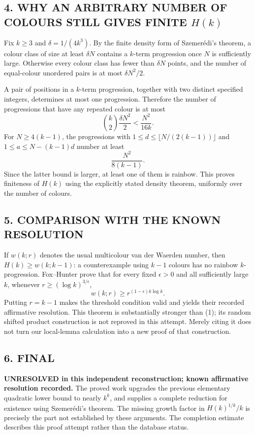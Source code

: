 \subsection*{4. WHY AN ARBITRARY NUMBER OF COLOURS STILL GIVES FINITE $H(k)$}
Fix $k\ge3$ and $\delta=1/(4k^3)$. By the finite density form of Szemer\'edi's theorem, a colour class of size at least $\delta N$ contains a $k$-term progression once $N$ is sufficiently large. Otherwise every colour class has fewer than $\delta N$ points, and the number of equal-colour unordered pairs is at most $\delta N^2/2$.

A pair of positions in a $k$-term progression, together with two distinct specified integers, determines at most one progression. Therefore the number of progressions that have any repeated colour is at most
\[
 \binom{k}{2}\frac{\delta N^2}{2}<\frac{N^2}{16k}.
\]
For $N\ge4(k-1)$, the progressions with
$1\le d\le\lfloor N/(2(k-1))\rfloor$ and
$1\le a\le N-(k-1)d$ number at least
\[
 \frac{N^2}{8(k-1)}.
\]
Since the latter bound is larger, at least one of them is rainbow. This proves finiteness of $H(k)$ using the explicitly stated density theorem, uniformly over the number of colours.
\subsection*{5. COMPARISON WITH THE KNOWN RESOLUTION}
If $w(k;r)$ denotes the usual multicolour van der Waerden number, then $H(k)\ge w(k;k-1)$: a counterexample using $k-1$ colours has no rainbow $k$-progression. Fox--Hunter prove that for every fixed $\epsilon>0$ and all sufficiently large $k$, whenever $r\ge(\log k)^{3/\epsilon}$,
\[
 w(k;r)\ge r^{(1-\epsilon)k\log k}.
\]
Putting $r=k-1$ makes the threshold condition valid and yields their recorded affirmative resolution. This theorem is substantially stronger than (1); its random shifted product construction is not reproved in this attempt. Merely citing it does not turn our local-lemma calculation into a new proof of that construction.
\subsection*{6. FINAL}
\textbf{UNRESOLVED in this independent reconstruction; known affirmative resolution recorded.}
The proved work upgrades the previous elementary quadratic lower bound to nearly $k^k$, and supplies a complete reduction for existence using Szemer\'edi's theorem. The missing growth factor in $H(k)^{1/k}/k$ is precisely the part not established by these arguments. The completion estimate describes this proof attempt rather than the database status.
